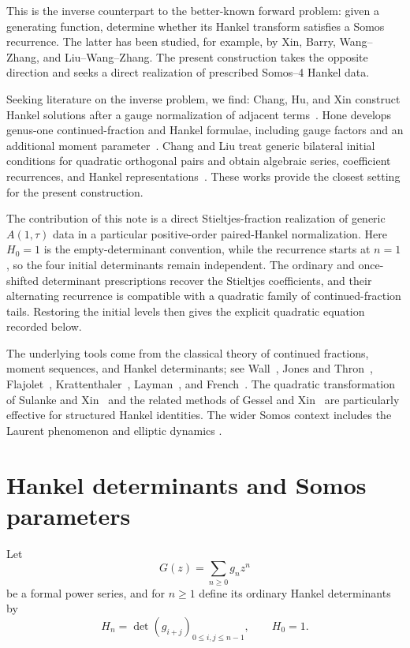 \documentclass[11pt]{article}
\theoremstyle{remark}
\begin{document}
This is the inverse counterpart to the better-known forward problem: given a
generating function, determine whether its Hankel transform satisfies a Somos
recurrence.  The latter has been studied, for example, by Xin, Barry,
Wang--Zhang, and Liu--Wang--Zhang.  The present construction takes the
opposite direction and seeks a direct realization of prescribed Somos--4
Hankel data.

Seeking literature on the inverse problem, we find:  Chang, Hu, and Xin
construct Hankel solutions after a gauge normalization of adjacent
terms~\cite{ChangHuXin2015}.  Hone develops genus-one continued-fraction and
Hankel formulae, including gauge factors and an additional moment
parameter~\cite{Hone2021}.  Chang and Liu treat generic bilateral initial
conditions for quadratic orthogonal pairs and obtain algebraic series,
coefficient recurrences, and Hankel representations~\cite{ChangLiu2026}.
These works provide the closest setting for the present construction.

The contribution of this note is a direct Stieltjes-fraction realization of
generic $A(1,\tau)$ data in a particular positive-order paired-Hankel
normalization.  Here $H_0=1$ is the empty-determinant convention, while the
recurrence starts at $n=1$, so the four initial determinants remain
independent.  The ordinary and once-shifted determinant prescriptions recover
the Stieltjes coefficients, and their alternating recurrence is compatible
with a quadratic family of continued-fraction tails.  Restoring the initial
levels then gives the explicit quadratic equation recorded below.

The underlying tools come from the classical theory of continued fractions,
moment sequences, and Hankel determinants; see Wall~\cite{Wall1948}, Jones and
Thron~\cite{JonesThron1980}, Flajolet~\cite{Flajolet1980},
Krattenthaler~\cite{Krattenthaler1999,Krattenthaler2005},
Layman~\cite{Layman2001}, and French~\cite{French2007}.  The quadratic
transformation of Sulanke and Xin~\cite{SulankeXin2007} and the related
methods of Gessel and Xin~\cite{GesselXin2006} are particularly effective for
structured Hankel identities.  The wider Somos context includes the Laurent
phenomenon and elliptic dynamics
\cite{Gale1991,FominZelevinsky2002,VanderPoortenSwart2006,Hone2005,HoneSwart2008}.
\section{Hankel determinants and Somos parameters}

Let
\[
 G(z)=\sum_{n\geq0}g_nz^n
\]
be a formal power series, and for $n\geq1$ define its ordinary Hankel
determinants by
\begin{equation}
 H_n=\det(g_{i+j})_{0\leq i,j\leq n-1},
 \qquad H_0=1.
 \label{eq:Hankel}
\end{equation}
\end{document}
